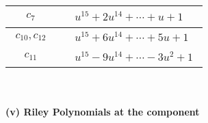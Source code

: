 \documentclass[1p]{elsarticle_modified}
\theoremstyle{definition}
\begin{document}
\begin{tabular}{m{50pt}|m{274pt}}
\hline $$\begin{aligned}c_{7}\end{aligned}$$&$\begin{aligned}
&u^{15}+2 u^{14}+\cdots+u+1
\end{aligned}$\\
\hline $$\begin{aligned}c_{10},c_{12}\end{aligned}$$&$\begin{aligned}
&u^{15}+6 u^{14}+\cdots+5 u+1
\end{aligned}$\\
\hline $$\begin{aligned}c_{11}\end{aligned}$$&$\begin{aligned}
&u^{15}-9 u^{14}+\cdots-3 u^2+1
\end{aligned}$\\
\hline
\end{tabular}\\~\\
\newpage\renewcommand{\arraystretch}{1}
\flushleft \textbf{(v) Riley Polynomials at the component}\newline \\
\end{document}
